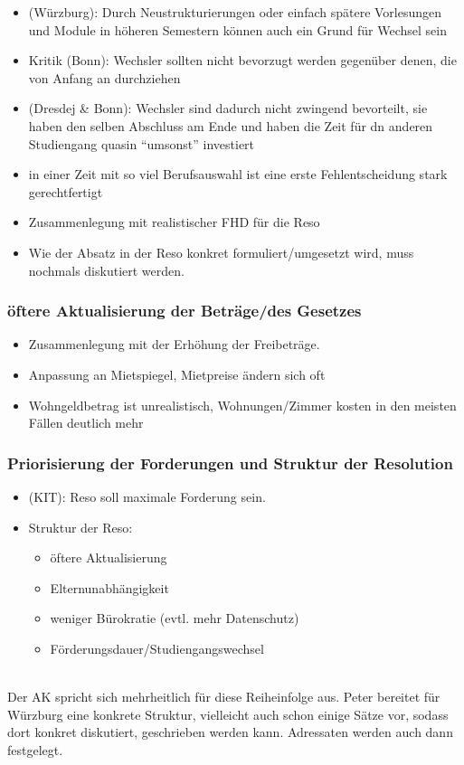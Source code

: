 \begin{itemize}
        \item (Würzburg): Durch Neustrukturierungen oder einfach spätere Vorlesungen und Module in höheren Semestern können auch ein Grund für Wechsel sein
        \item Kritik (Bonn): Wechsler sollten nicht bevorzugt werden gegenüber denen, die von Anfang an durchziehen
        \item (Dresdej & Bonn): Wechsler sind dadurch nicht zwingend bevorteilt, sie haben den selben Abschluss am Ende und haben die Zeit für dn anderen Studiengang quasin “umsonst” investiert
        \item in einer Zeit mit so viel Berufsauswahl ist eine erste Fehlentscheidung stark gerechtfertigt
        \item Zusammenlegung mit realistischer FHD für die Reso
        \item Wie der Absatz in der Reso konkret formuliert/umgesetzt wird, muss nochmals diskutiert werden.
      \end{itemize}
      
    \subsubsection{öftere Aktualisierung der Beträge/des Gesetzes}
      \begin{itemize}
        \item Zusammenlegung mit der Erhöhung der Freibeträge.
        \item Anpassung an Mietspiegel, Mietpreise ändern sich oft
        \item Wohngeldbetrag ist unrealistisch, Wohnungen/Zimmer kosten in den meisten Fällen deutlich mehr
      \end{itemize}

    \subsubsection{Priorisierung der Forderungen und Struktur der Resolution}
      \begin{itemize}
        \item (KIT): Reso soll maximale Forderung sein.
        \item Struktur der Reso:
          \begin{itemize}
            \item öftere Aktualisierung
            \item Elternunabhängigkeit
            \item weniger Bürokratie (evtl. mehr Datenschutz)
            \item Förderungsdauer/Studiengangswechsel
          \end{itemize}
      \end{itemize} \\

Der AK spricht sich mehrheitlich für diese Reiheinfolge aus.
Peter bereitet für Würzburg eine konkrete Struktur, vielleicht auch schon einige Sätze vor, sodass dort konkret diskutiert, geschrieben werden kann. Adressaten werden auch dann festgelegt.
